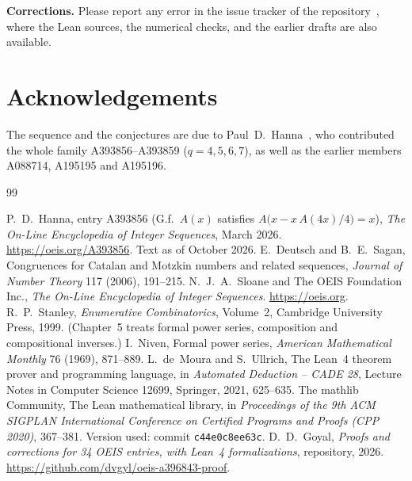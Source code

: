 \documentclass[11pt,a4paper]{article}
\theoremstyle{definition}
\theoremstyle{remark}
\newcommand{\para}[1]{\par\medskip\noindent\textbf{#1}\enspace}
\begin{document}
\para{Corrections.} Please report any error in the issue tracker of the repository~\cite{repo}, where the Lean
sources, the numerical checks, and the earlier drafts are also available.

\section*{Acknowledgements}
The sequence and the conjectures are due to Paul~D.~Hanna~\cite{oeis}, who contributed
the whole family A393856--A393859 ($q=4,5,6,7$), as well as the earlier members A088714, A195195 and A195196.

\begin{thebibliography}{99}\small
\raggedright
{} P.~D.~Hanna, entry A393856 (G.f.\ $A(x)$ satisfies $A\bigl(x-x\,A(4x)/4\bigr)=x$), \emph{The On-Line Encyclopedia of Integer Sequences}, March 2026. \url{https://oeis.org/A393856}. Text as of October 2026.
 E.~Deutsch and B.~E.~Sagan, Congruences for Catalan and Motzkin numbers and related sequences, \emph{Journal of Number Theory} 117 (2006), 191--215.
 N.~J.~A.~Sloane and The OEIS Foundation Inc., \emph{The On-Line Encyclopedia of Integer Sequences}. \url{https://oeis.org}.
 R.~P.~Stanley, \emph{Enumerative Combinatorics}, Volume~2, Cambridge University Press, 1999. (Chapter~5 treats formal power series, composition and compositional inverses.)
 I.~Niven, Formal power series, \emph{American Mathematical Monthly} 76 (1969), 871--889.
 L.~de~Moura and S.~Ullrich, The Lean~4 theorem prover and programming language, in \emph{Automated Deduction -- CADE 28}, Lecture Notes in Computer Science 12699, Springer, 2021, 625--635.
 The mathlib Community, The Lean mathematical library, in \emph{Proceedings of the 9th ACM SIGPLAN International Conference on Certified Programs and Proofs (CPP 2020)}, 367--381. Version used: commit \texttt{c44e0c8ee63c}.
 D.~D.~Goyal, \emph{Proofs and corrections for 34 OEIS entries, with Lean~4 formalizations}, repository, 2026. \url{https://github.com/dvgyl/oeis-a396843-proof}.
\end{thebibliography}
\end{document}
